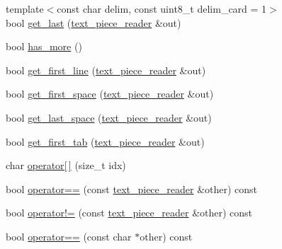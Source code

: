 \begin{DoxyCompactItemize}
\item 
{\footnotesize template$<$const char delim, const uint8\+\_\+t delim\+\_\+card = 1$>$ }\\bool \hyperlink{classuva_1_1utils_1_1file_1_1text__piece__reader_af963eb03dd4b324e8ad27aa5108c8ef9}{get\+\_\+last} (\hyperlink{classuva_1_1utils_1_1file_1_1text__piece__reader}{text\+\_\+piece\+\_\+reader} \&out)
\item 
bool \hyperlink{classuva_1_1utils_1_1file_1_1text__piece__reader_af6d3ba626815b9b25a99061f5dd100fb}{has\+\_\+more} ()
\item 
bool \hyperlink{classuva_1_1utils_1_1file_1_1text__piece__reader_aa7d0af64f2a746bb2d6ef46c166c722e}{get\+\_\+first\+\_\+line} (\hyperlink{classuva_1_1utils_1_1file_1_1text__piece__reader}{text\+\_\+piece\+\_\+reader} \&out)
\item 
bool \hyperlink{classuva_1_1utils_1_1file_1_1text__piece__reader_a26973d469dfd8ba511ee8fe59c27fed3}{get\+\_\+first\+\_\+space} (\hyperlink{classuva_1_1utils_1_1file_1_1text__piece__reader}{text\+\_\+piece\+\_\+reader} \&out)
\item 
bool \hyperlink{classuva_1_1utils_1_1file_1_1text__piece__reader_aa2d314a74ee0c02226ba63816e67a7bb}{get\+\_\+last\+\_\+space} (\hyperlink{classuva_1_1utils_1_1file_1_1text__piece__reader}{text\+\_\+piece\+\_\+reader} \&out)
\item 
bool \hyperlink{classuva_1_1utils_1_1file_1_1text__piece__reader_af871a0a3172389e03470a45d787db002}{get\+\_\+first\+\_\+tab} (\hyperlink{classuva_1_1utils_1_1file_1_1text__piece__reader}{text\+\_\+piece\+\_\+reader} \&out)
\item 
char \hyperlink{classuva_1_1utils_1_1file_1_1text__piece__reader_ac0ccc1d58f54534d3cfeb98c0d52dd02}{operator\mbox{[}$\,$\mbox{]}} (size\+\_\+t idx)
\item 
bool \hyperlink{classuva_1_1utils_1_1file_1_1text__piece__reader_a35ee2bf906253788a389335914c8c676}{operator==} (const \hyperlink{classuva_1_1utils_1_1file_1_1text__piece__reader}{text\+\_\+piece\+\_\+reader} \&other) const 
\item 
bool \hyperlink{classuva_1_1utils_1_1file_1_1text__piece__reader_a0e37a44e3b5ed500e1a2aac0bf4768bb}{operator!=} (const \hyperlink{classuva_1_1utils_1_1file_1_1text__piece__reader}{text\+\_\+piece\+\_\+reader} \&other) const 
\item 
bool \hyperlink{classuva_1_1utils_1_1file_1_1text__piece__reader_aa35eed29e9079155dff7a6d248fa96f7}{operator==} (const char $\ast$other) const 
\item 

\end{DoxyCompactItemize}
